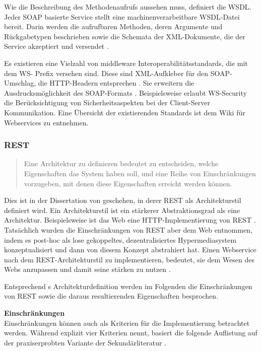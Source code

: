 \documentclass[12pt,a4paper,bibliography=totocnumbered,listof=totoc]{scrartcl}
\begin{document}
Wie die Beschreibung des Methodenaufrufs aussehen muss, definiert die \ac{WSDL}. Jeder SOAP basierte Service stellt eine machinenverarbeitbare \ac{WSDL}-Datei bereit. Darin werden die aufrufbaren Methoden, deren Argumente und Rückgabetypen beschrieben sowie die Schemata der XML-Dokumente, die der Service akzeptiert und versendet \citep{richardson07}.

Es existieren eine Vielzahl von middleware Interoperabilitätsstandards, die mit dem \glqq WS-\grqq{} Prefix versehen sind. Diese sind XML-Aufkleber für den SOAP-Umschlag, die HTTP-Headern entsprechen \citep{richardson07}. Sie erweitern die Ausdrucksmöglichkeit des SOAP-Formats \citep{wilde11}. Beispielsweise erlaubt WS-Security die Berücksichtigung von Sicherheitsaspekten bei der Client-Server Kommunikation.  Eine Übersicht der existierenden Standards ist dem Wiki für Webservices \citeauthor{webServiceWiki09} zu entnehmen.

\subsubsection{REST}
\begin{quote}
\glqq Eine Architektur zu definieren bedeutet zu entscheiden, welche Eigenschaften das System haben soll, und eine Reihe von Einschränkungen vorzugeben, mit denen diese Eigenschaften erreicht werden können.\grqq{} \citep{tilkov11}
\end{quote}

Dies ist in der Dissertation von \citeauthor{fielding00} geschehen, in derer REST als Architekturstil definiert wird. Ein Architekturstil ist ein stärkerer Abstraktionsgrad als eine Architektur. Beispielsweise ist das Web eine HTTP-Implementierung von REST \citep{tilkov11}. Tatsächlich wurden die Einschränkungen von REST aber dem Web entnommen, indem \citeauthor{fielding00} es post-hoc als lose gekoppeltes, dezentralisiertes Hypermediasystem konzeptualisiert \citep{wilde11} und dann von diesem Konzept abstrahiert hat. Einen Webservice nach dem REST-Architekturstil zu implementieren, bedeutet, sie dem Wesen des Webs anzupassen und damit seine stärken zu nutzen \citep{tilkov11}.

Entsprechend \citeauthor{tilkov11}s Architekturdefinition werden im Folgenden die Einschränkungen von REST sowie die daraus resultierenden Eigenschaften besprochen.

\textbf{Einschränkungen}\\
Einschränkungen können auch als Kriterien für die Implementierung betrachtet werden. Während \citeauthor{fielding00} explizit vier Kriterien nennt, basiert die folgende Auflistung auf der praxiserprobten Variante der Sekundärliteratur \citep{wilde11, tilkov11}.
\end{document}
